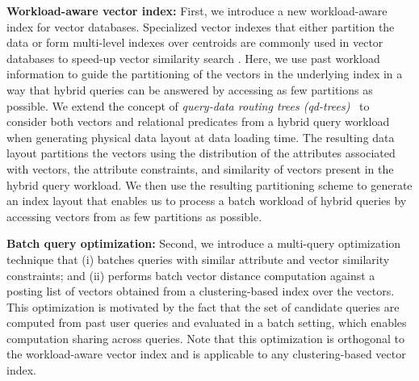 
\textbf{Workload-aware vector index:}
First, we introduce a new workload-aware index for vector databases.
Specialized vector indexes that either partition the data or form multi-level indexes over centroids are commonly used in vector databases to speed-up vector similarity search \cite{guo2022manu, wang2021milvus, yang2020pase}. Here, we use past workload information to guide the partitioning of the vectors in the underlying index in a  way that hybrid queries can be answered by accessing as few partitions as possible. We extend the concept of \emph{query-data routing trees (qd-trees)}~\cite{qd-tree} to consider both vectors and relational predicates from a hybrid query workload when generating physical data layout at data loading time. The resulting data layout partitions the vectors using the distribution of the attributes associated with vectors, the attribute constraints, and similarity of vectors present in the hybrid query workload. We then use the resulting partitioning scheme to generate an index layout that enables us to process a batch workload of hybrid queries by accessing vectors from as few partitions as possible.

\textbf{Batch query optimization:}
Second, we introduce a multi-query optimization technique that (i) batches queries with similar attribute and vector similarity constraints; and (ii) performs batch vector distance computation against a posting list of vectors obtained from a clustering-based index over the vectors. 
This optimization is motivated by the fact that the set of candidate queries are computed from past user queries and evaluated in a batch setting, which enables computation sharing across queries.
Note that this optimization is orthogonal to the workload-aware vector index and is applicable to any clustering-based vector index.

\fi